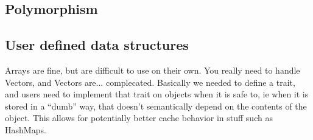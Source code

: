 \documentclass[12pt,final]{article}
\begin{document}
\subsection{Polymorphism}

\subsection{User defined data structures}
Arrays are fine, but are difficult to use on their own. You really need to
handle Vectors, and Vectors are... complecated. Basically we needed to define a
trait, and users need to implement that trait on objects when it is safe to, ie
when it is stored in a ``dumb'' way, that doesn't semantically depend on the
contents of the object. This allows for potentially better cache behavior in
stuff such as HashMaps.
\end{document}
